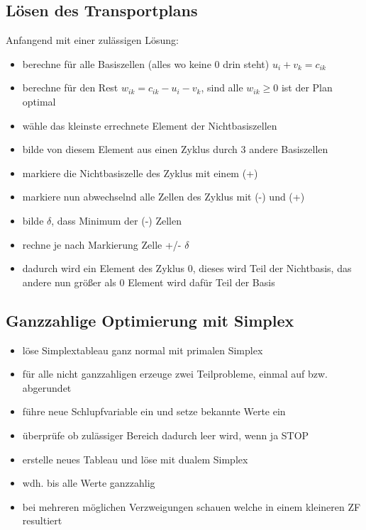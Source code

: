 \documentclass[12pt,a4paper, hyperref]{article}
\begin{document}
\subsection{Lösen des Transportplans}
Anfangend mit einer zulässigen Lösung:
\begin{itemize}
\item berechne für alle Basiszellen (alles wo keine 0 drin steht) $u_i + v_k = c_{ik}$
\item berechne für den Rest $w_{ik} = c_{ik} - u_i - v_k$, sind alle $w_{ik} \geq 0$ ist der Plan optimal
\item wähle das kleinste errechnete Element der Nichtbasiszellen
\item bilde von diesem Element aus einen Zyklus durch 3 andere Basiszellen
\item markiere die Nichtbasiszelle des Zyklus mit einem (+)
\item markiere nun abwechselnd alle Zellen des Zyklus mit (-) und (+)
\item bilde $\delta$, dass Minimum der (-) Zellen
\item rechne je nach Markierung Zelle +/- $\delta$
\item dadurch wird ein Element des Zyklus 0, dieses wird Teil der Nichtbasis, das andere nun größer als 0 Element wird dafür Teil der Basis
\end{itemize}

\subsection{Ganzzahlige Optimierung mit Simplex}
\begin{itemize}
\item löse Simplextableau ganz normal mit primalen Simplex
\item für alle nicht ganzzahligen erzeuge zwei Teilprobleme, einmal auf bzw. abgerundet
\item führe neue Schlupfvariable ein und setze bekannte Werte ein
\item überprüfe ob zulässiger Bereich dadurch leer wird, wenn ja STOP
\item erstelle neues Tableau und löse mit dualem Simplex
\item wdh. bis alle Werte ganzzahlig
\item bei mehreren möglichen Verzweigungen schauen welche in einem kleineren ZF resultiert
\end{itemize}
\end{document}
